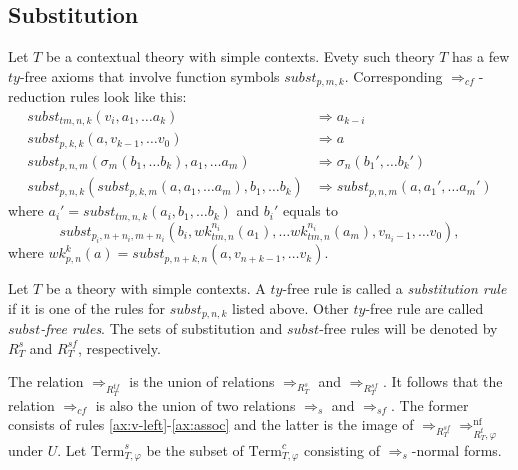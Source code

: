 \documentclass[reqno]{amsart}
\theoremstyle{definition}
\theoremstyle{remark}
\newcommand{\nf}{\mathrm{nf}}
\newcommand{\Term}{\mathrm{Term}}
\newcommand{\subst}{\mathit{subst}}
\newcommand{\wk}{\mathit{wk}}
\newcommand{\ty}{\mathit{ty}}
\newcommand{\tm}{\mathit{tm}}
\numberwithin{figure}{section}
\begin{document}
\subsection{Substitution}
\label{sec:subst}

Let $T$ be a contextual theory with simple contexts.
Evety such theory $T$ has a few $\ty$-free axioms that involve function symbols $\subst_{p,m,k}$.
Corresponding $\Rightarrow_{cf}$-reduction rules look like this:
\begin{align}
\subst_{\tm,n,k}(v_i, a_1, \ldots a_k) & \Rightarrow a_{k-i} \label{ax:v-left} \\
\subst_{p,k,k}(a, v_{k-1}, \ldots v_0) & \Rightarrow a \label{ax:v-right} \\
\subst_{p,n,m}(\sigma_m(b_1, \ldots b_k), a_1, \ldots a_m) & \Rightarrow \sigma_n(b_1', \ldots b_k') \label{ax:sigma} \\
\subst_{p,n,k}(\subst_{p,k,m}(a, a_1, \ldots a_m), b_1, \ldots b_k) & \Rightarrow \subst_{p,n,m}(a, a_1', \ldots a_m') \label{ax:assoc}
\end{align}
where $a_i' = \subst_{\tm,n,k}(a_i, b_1, \ldots b_k)$ and $b_i'$ equals to
\[ \subst_{p_i,n+n_i,m+n_i}(b_i, \wk^{n_i}_{\tm,n}(a_1), \ldots \wk^{n_i}_{\tm,n}(a_m), v_{n_i-1}, \ldots v_0), \]
where $\wk^k_{p,n}(a) = \subst_{p,n+k,n}(a, v_{n+k-1}, \ldots v_k)$.

Let $T$ be a theory with simple contexts.
A $\ty$-free rule is called a \emph{substitution rule} if it is one of the rules for $\subst_{p,n,k}$ listed above.
Other $\ty$-free rule are called \emph{$\subst$-free rules}.
The sets of substitution and $\subst$-free rules will be denoted by $R^s_T$ and $R^{sf}_T$, respectively.

The relation $\Rightarrow_{R_T^{tf}}$ is the union of relations $\Rightarrow_{R_T^s}$ and $\Rightarrow_{R_T^{sf}}$.
It follows that the relation $\Rightarrow_{cf}$ is also the union of two relations $\Rightarrow_s$ and $\Rightarrow_{sf}$.
The former consists of rules \eqref{ax:v-left}-\eqref{ax:assoc} and the latter is the image of $\Rightarrow_{R_T^{sf}} \Rightarrow_{R_T^t,\varphi}^\nf$ under $U$.
Let $\Term_{T,\varphi}^s$ be the subset of $\Term_{T,\varphi}^c$ consisting of $\Rightarrow_s$-normal forms.
\end{document}
